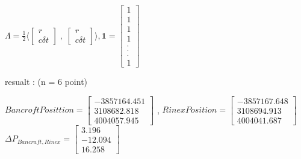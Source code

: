 \documentclass[12pt]{article}
\begin{document}
\begin{center}

$\Lambda = \frac{1}{2} \langle \begin{bmatrix}
     r\\
     c \delta t
\end{bmatrix} \; , \; \begin{bmatrix}
     r\\
     c\delta t
\end{bmatrix}  \rangle , \textbf{1} = \begin{bmatrix}
     1\\
     1\\
     1\\
     1\\
     .\\
     .\\
     .\\
     1
\end{bmatrix} $
\end{center}
\newpage
resualt : (n = 6 point) \\[0.5in]
\begin{center}
 $Bancroft Posittion = \begin{bmatrix}
         -3857164.451\\
          3108682.818\\
          4004057.945
\end{bmatrix}$ , $RinexPosition = \begin{bmatrix}
             -3857167.648\\
              3108694.913\\
              4004041.687
\end{bmatrix}$ \\[0.5in]
$\Delta P_{Bancraft,Rinex} = \begin{bmatrix}
           3.196\\
            -12.094\\
          16.258
\end{bmatrix}$
\end{center}
\end{document}
